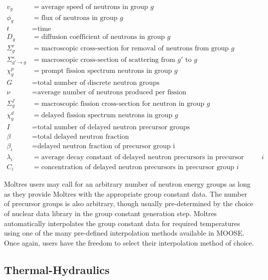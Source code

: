 {\small
%
\begin{align*}
	v_g &= \text{average speed of neutrons in group }g \\
	\phi_g &= \text{flux of neutrons in group }g \\
	t &= \text{time} \\
	D_g &= \text{diffusion coefficient of neutrons in group }g \\
	\Sigma^r_g &= \text{macroscopic cross-section for removal of neutrons from
	group }g \\
	\Sigma^s_{g' \rightarrow g} &= \text{macroscopic cross-section of
	scattering from }g' \text{ to }g \\
	\chi^p_g &= \text{prompt fission spectrum neutrons in group }g \\
	G &= \text{total number of discrete neutron groups} \\
	\nu &= \text{average number of neutrons produced per fission} \\
	\Sigma^f_{g} &= \text{macroscopic fission cross-section for neutron in group }g \\
	\chi^d_g &= \text{delayed fission spectrum neutrons in group }g \\
	I &= \text{total number of delayed neutron precursor groups} \\
	\beta &= \text{total delayed neutron fraction} \\
	\beta_i &= \text{delayed neutron fraction of precursor group i} \\
	\lambda_i &= \text{average decay constant of delayed neutron precursors in precursor group }i \\
	C_i &= \text{concentration of delayed neutron precursors in precursor group }i
\end{align*}
}
%

Moltres users may call for an arbitrary number of neutron energy groups as
long as they provide Moltres with the appropriate group constant data. The
number of precursor groups is also arbitrary, though usually pre-determined by
the choice of nuclear data library in the group constant generation step.
Moltres automatically interpolates the group constant data for required
temperatures using one of the many pre-defined interpolation methods available
in \gls{MOOSE}. Once again, users have the freedom to select their
interpolation method of choice.

\subsection{Thermal-Hydraulics}

